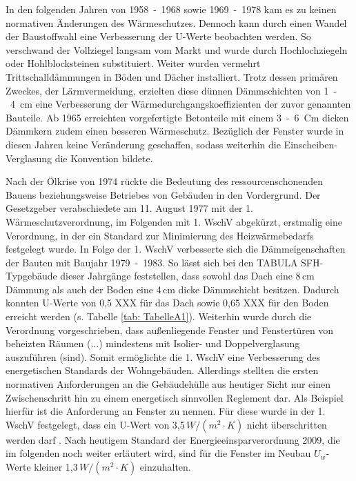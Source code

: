 In den folgenden Jahren von \mbox{1958 - 1968} sowie \mbox{1969 - 1978} kam es zu keinen normativen Änderungen des Wärmeschutzes. 
Dennoch kann durch einen Wandel der Baustoffwahl eine Verbesserung der U-Werte beobachten werden. 
So verschwand der Vollziegel langsam vom Markt und wurde durch Hochlochziegeln oder Hohlblocksteinen substituiert.
Weiter wurden vermehrt Trittschalldämmungen in Böden und Dächer installiert. 
Trotz dessen primären Zweckes, der Lärmvermeidung, erzielten diese dünnen Dämmschichten von \mbox{1 - 4 cm} eine Verbesserung der Wärmedurchgangskoeffizienten der zuvor genannten Bauteile.
Ab 1965 erreichten vorgefertigte Betonteile mit einem \mbox{3 - 6 Cm} dicken Dämmkern zudem einen besseren Wärmeschutz.
Bezüglich der Fenster wurde in diesen Jahren keine Veränderung geschaffen, sodass weiterhin die Einscheiben-Verglasung die Konvention bildete.

Nach der Ölkrise von 1974 rückte die Bedeutung des ressourcenschonenden Bauens beziehungsweise Betriebes von Gebäuden in den Vordergrund. 
Der Gesetzgeber verabschiedete am 11. August 1977 mit der 1. Wärmeschutzverordnung, im Folgenden mit 1. WschV abgekürzt, erstmalig eine Verordnung, in der ein Standard zur Minimierung des Heizwärmebedarfs festgelegt wurde. 
In Folge der 1. WschV verbesserte sich die Dämmeigenschaften der Bauten mit Baujahr \mbox{1979 - 1983}.
So lässt sich bei den TABULA SFH-Typgebäude dieser Jahrgänge feststellen, dass sowohl das Dach eine 8\,cm Dämmung als auch der Boden eine 4\,cm dicke Dämmschicht besitzen. 
Dadurch konnten U-Werte von 0,5 XXX für das Dach sowie 0,65 XXX für den Boden erreicht werden (s. Tabelle \ref{tab: TabelleA1}).
Weiterhin wurde durch die Verordnung vorgeschrieben, dass \glqq außenliegende Fenster und Fenstertüren von beheizten Räumen (...) mindestens mit Isolier- und Doppelverglasung auszuführen (sind)\grqq \cite{Bundesregierung.1977}.
Somit ermöglichte die 1. WschV eine Verbesserung des energetischen Standards der Wohngebäuden. 
Allerdings stellten die ersten normativen Anforderungen an die Gebäudehülle aus heutiger Sicht nur einen Zwischenschritt hin zu einem energetisch sinnvollen Reglement dar.
Als Beispiel hierfür ist die Anforderung an Fenster zu nennen. 
Für diese wurde in der 1. WschV festgelegt, dass ein U-Wert von 3,5\,\(W/(m^2 \cdot K) \) nicht überschritten werden darf \cite{Bundesregierung.1977}.
Nach heutigem Standard der Energieeinsparverordnung 2009, die im folgenden noch weiter erläutert wird, sind für die Fenster im Neubau \(U_w\)-Werte kleiner 1,3\,\(W/(m^2 \cdot K) \) einzuhalten.

